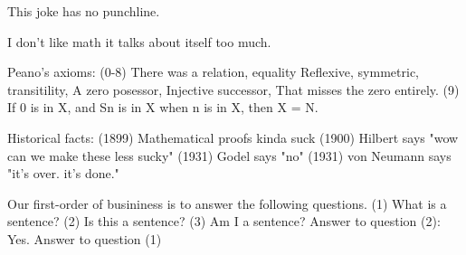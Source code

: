This joke has no punchline.

I don't like math it talks about itself too much.

Peano's axioms:
(0-8) 	There was a relation, equality
		Reflexive, symmetric, transitility,
		A zero posessor,
		Injective successor,
		That misses the zero entirely.
(9)		If 0 is in X, and Sn is in X when n is in X, then X = N.

Historical facts:
(1899) Mathematical proofs kinda suck
(1900) Hilbert says "wow can we make these less sucky"
(1931) Godel says "no"
(1931) von Neumann says "it's over. it's done."

Our first-order of busininess is to answer the following questions.
(1) What is a sentence?
(2) Is this a sentence?
(3) Am I a sentence?
Answer to question (2):
Yes.
Answer to question (1)